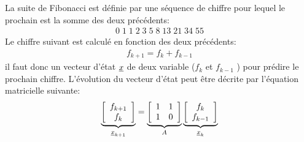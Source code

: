 La suite de Fibonacci est définie par une séquence de chiffre pour lequel le prochain est la somme des deux précédents:
\begin{align}
0 \; 1\;1\;2\;3\;5\;8\;13\;21\;34\;55
\end{align}
Le chiffre suivant est calculé en fonction des deux précédents:
\begin{align}
f_{k+1} = f_{k} + f_{k-1}
\end{align}
il faut donc un vecteur d'état $\underline{x}$ de deux variable ($f_{k}$ et $f_{k-1}$ ) pour prédire le prochain chiffre. L'évolution du vecteur d'état peut être décrite par l'équation matricielle suivante:
\begin{align}
\underbrace{
\left[ \begin{array}{c}  
f_{k+1} \\ f_{k}
\end{array} \right]
}_{\underline{x}_{k+1}}
=
\underbrace{
\left[ \begin{array}{c c}  
1 & 1 \\ 1 & 0 
\end{array} \right]
}_{A}
\underbrace{
\left[ \begin{array}{c}  
f_{k} \\ f_{k-1}
\end{array} \right]
}_{\underline{x}_{k}}
\end{align}

